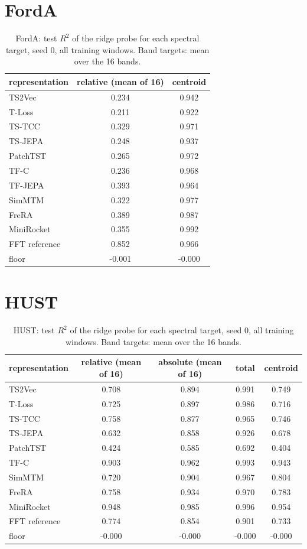 \section{FordA}
\begin{table}[ht]
\centering
\footnotesize
\begin{tabular}{lcc}
\toprule
representation & relative (mean of 16) & centroid \\
\midrule
TS2Vec & 0.234 & 0.942 \\
T-Loss & 0.211 & 0.922 \\
TS-TCC & 0.329 & 0.971 \\
TS-JEPA & 0.248 & 0.937 \\
PatchTST & 0.265 & 0.972 \\
TF-C & 0.236 & 0.968 \\
TF-JEPA & 0.393 & 0.964 \\
SimMTM & 0.322 & 0.977 \\
FreRA & 0.389 & 0.987 \\
\midrule
MiniRocket & 0.355 & 0.992 \\
\midrule
FFT reference & 0.852 & 0.966 \\
floor & -0.001 & -0.000 \\
\bottomrule
\end{tabular}
\caption{FordA: test $R^2$ of the ridge probe for each spectral target, seed 0, all training windows. Band targets: mean over the 16 bands.}
\end{table}

\section{HUST}
\begin{table}[ht]
\centering
\footnotesize
\begin{tabular}{lcccc}
\toprule
representation & relative (mean of 16) & absolute (mean of 16) & total & centroid \\
\midrule
TS2Vec & 0.708 & 0.894 & 0.991 & 0.749 \\
T-Loss & 0.725 & 0.897 & 0.986 & 0.716 \\
TS-TCC & 0.758 & 0.877 & 0.965 & 0.746 \\
TS-JEPA & 0.632 & 0.858 & 0.926 & 0.678 \\
PatchTST & 0.424 & 0.585 & 0.692 & 0.404 \\
TF-C & 0.903 & 0.962 & 0.993 & 0.943 \\
SimMTM & 0.720 & 0.904 & 0.967 & 0.804 \\
FreRA & 0.758 & 0.934 & 0.970 & 0.783 \\
\midrule
MiniRocket & 0.948 & 0.985 & 0.996 & 0.954 \\
\midrule
FFT reference & 0.774 & 0.854 & 0.901 & 0.733 \\
floor & -0.000 & -0.000 & -0.000 & -0.000 \\
\bottomrule
\end{tabular}
\caption{HUST: test $R^2$ of the ridge probe for each spectral target, seed 0, all training windows. Band targets: mean over the 16 bands.}
\end{table}

